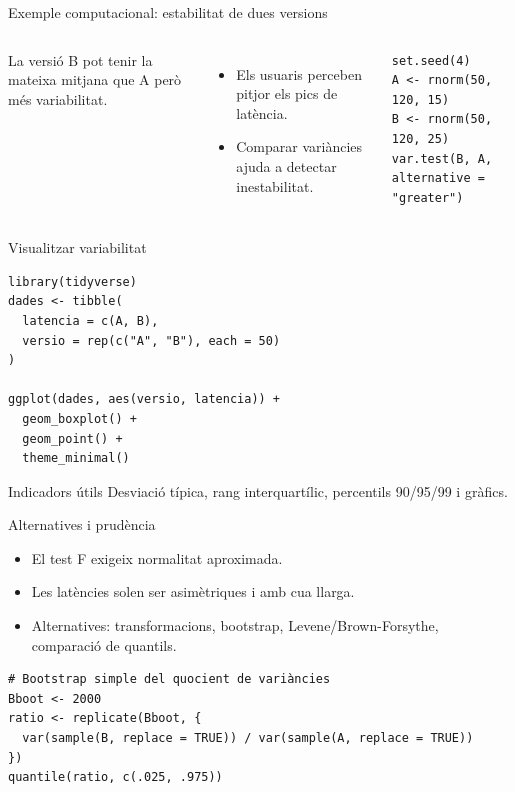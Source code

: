 \documentclass[10pt,aspectratio=169]{beamer}
\begin{document}
\begin{frame}[fragile]{Exemple computacional: estabilitat de dues versions}
\begin{columns}[T]
La versió B pot tenir la mateixa mitjana que A però més variabilitat.
\begin{itemize}
  \item Els usuaris perceben pitjor els pics de latència.
  \item Comparar variàncies ajuda a detectar inestabilitat.
\end{itemize}
\begin{lstlisting}
set.seed(4)
A <- rnorm(50, 120, 15)
B <- rnorm(50, 120, 25)
var.test(B, A, alternative = "greater")
\end{lstlisting}
\end{columns}
\end{frame}

\begin{frame}[fragile]{Visualitzar variabilitat}
\begin{lstlisting}
library(tidyverse)
dades <- tibble(
  latencia = c(A, B),
  versio = rep(c("A", "B"), each = 50)
)

ggplot(dades, aes(versio, latencia)) +
  geom_boxplot() +
  geom_point() +
  theme_minimal()
\end{lstlisting}
\begin{block}{Indicadors útils}
Desviació típica, rang interquartílic, percentils 90/95/99 i gràfics.
\end{block}
\end{frame}

\begin{frame}[fragile]{Alternatives i prudència}
\begin{itemize}
  \item El test F exigeix normalitat aproximada.
  \item Les latències solen ser asimètriques i amb cua llarga.
  \item Alternatives: transformacions, bootstrap, Levene/Brown-Forsythe, comparació de quantils.
\end{itemize}
\begin{lstlisting}
# Bootstrap simple del quocient de variàncies
Bboot <- 2000
ratio <- replicate(Bboot, {
  var(sample(B, replace = TRUE)) / var(sample(A, replace = TRUE))
})
quantile(ratio, c(.025, .975))
\end{lstlisting}
\end{frame}
\end{document}
